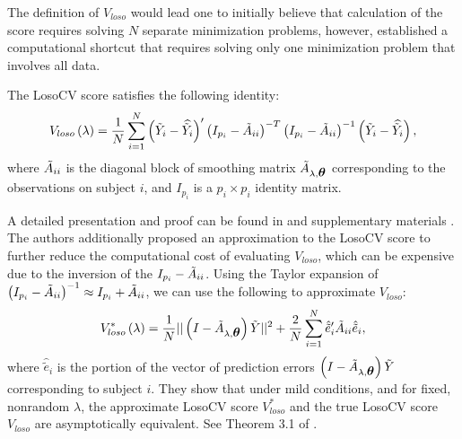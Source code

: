 \bigskip

The definition of $V_{loso}$ would lead one to initially believe that calculation of the score requires solving $N$ separate minimization problems, however, \cite{xu2012asymptotic} established a computational shortcut that requires solving only one minimization problem that involves all data. 
  
  \begin{lemma} \label{lemma:losocv-shortcut}
  The LosoCV score satisfies the following identity:
  \begin{equation*}
 V_{loso}\left( \lambda \right) = \frac{1}{N} \sum_{i = 1}^N \left(\tilde{Y}_i - \widehat{\tilde{Y}_i}\right)' \left(I_{p_i} - \tilde{A}_{ii}\right)^{-T}\left(I_{p_i} - \tilde{A}_{ii}\right)^{-1}\left(\tilde{Y}_i - \widehat{\tilde{Y}_i}\right),
  \end{equation*}
  \noindent
  where $\tilde{A}_{ii}$ is the diagonal block of smoothing matrix $\tilde{A}_{\lambda,\mbox{\boldmath $\theta$}}$ corresponding to the observations on subject $i$, and $I_{p_i}$ is a $p_i \times p_i$ identity matrix.
\end{lemma}

A detailed presentation and proof can be found in \cite{xu2012asymptotic} and supplementary materials \cite{xuasymptotic}.  The authors additionally proposed an approximation to the LosoCV score to further reduce the computational cost of evaluating $V_{loso}$, which can be expensive due to the inversion of the $I_{p_i} - \tilde{A}_{ii}$. Using the Taylor expansion of $\left(I_{p_i} - \tilde{A}_{ii}\right)^{-1} \approx I_{p_i} + \tilde{A}_{ii}$, we can use the following to approximate $V_{loso}$:
\begin{equation} \label{eq:approx-losocv}
V_{loso}^*\left( \lambda \right) = \frac{1}{N} \vert \vert \left(I - \tilde{A}_{\lambda,\mbox{\boldmath $\theta$}}\right)\tilde{Y} \vert \vert^2 + \frac{2}{N} \sum_{i = 1}^N \hat{\tilde{e}}'_{i}\tilde{A}_{ii}\hat{\tilde{e}}_i,
\end{equation}
\noindent
where $\hat{\tilde{e}}_i$ is the portion of the vector of prediction errors $\left(I - \tilde{A}_{\lambda,\mbox{\boldmath $\theta$}}\right)\tilde{Y}$ corresponding to subject $i$. They show that under mild conditions, and for fixed, nonrandom $\lambda$, the approximate LosoCV score $V_{loso}^*$ and the true LosoCV score $V_{loso}$ are asymptotically equivalent. See Theorem 3.1 of \cite{xu2012asymptotic}.
  

